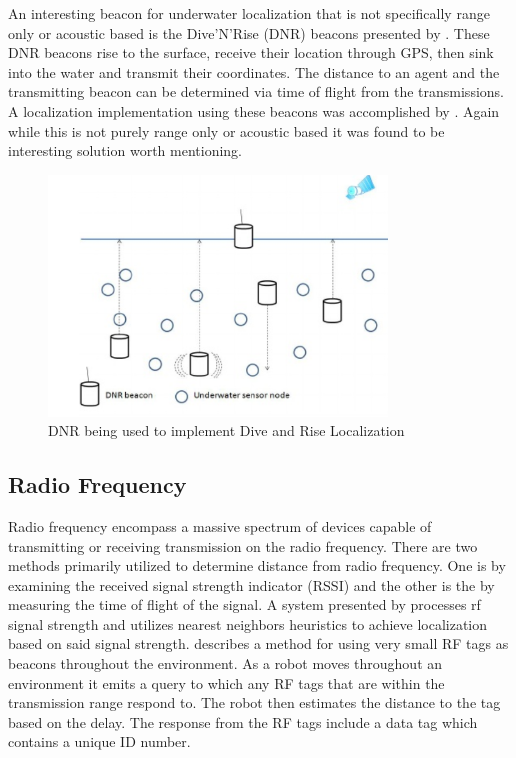 \documentclass[conference]{IEEEtran}
\begin{document}
	An interesting beacon for underwater localization that is not specifically range only or acoustic based is the Dive'N'Rise (DNR) beacons presented by \cite{Erol2007}. These DNR beacons rise to the surface, receive their location through GPS, then sink into the water and transmit their coordinates. The distance to an agent and the transmitting beacon can be determined via time of flight from the transmissions. A localization implementation using these beacons was accomplished by \cite{Erol2008}. Again while this is not purely range only or acoustic based it was found to be interesting solution worth mentioning.
	
  	\begin{figure}[h!]
	
	\centering
	
	\includegraphics[width=90mm]{DNR.png}
	
	\caption{DNR being used to implement Dive and Rise Localization  \cite{Erol-Kantarci2011}}
	
	\label{DNR}
	
\end{figure}


	\subsection{Radio Frequency}
	Radio frequency encompass a massive spectrum of devices capable of transmitting or receiving transmission on the radio frequency. There are two methods primarily utilized to determine distance from radio frequency. One is by examining the received signal strength indicator (RSSI) and the other is the by measuring the time of flight of the signal. A system presented by \cite{Padmanabhan2000} processes rf signal strength and utilizes nearest neighbors heuristics to achieve localization based on said signal strength.  \cite{Kurth2003a} describes a method for using very small RF tags as beacons throughout the environment.  As a robot moves throughout an environment it emits a query to which any RF tags that are within the transmission range respond to. The robot then estimates the distance to the tag based on the delay. The response from the RF tags include a data tag which contains a unique ID number. 
	
\end{document}

